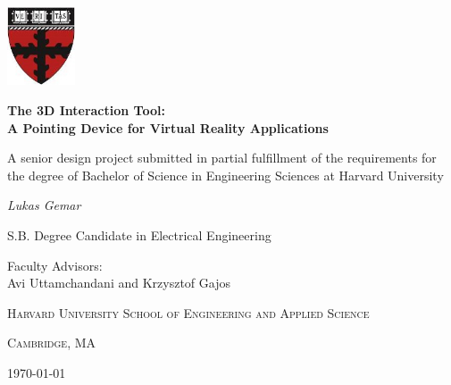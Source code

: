 \documentclass[12pt,a4paper]{report}
\begin{document}
\begin{titlepage}
	\centering
	\includegraphics[width=0.15\textwidth]{seas}\par\vspace{1cm}
	\vspace{1cm}
	{\large\bfseries The 3D Interaction Tool: \\ A Pointing Device for Virtual Reality Applications \par}
	\vspace{1cm}
	{\large A senior design project submitted in partial fulfillment of the requirements for the degree of Bachelor of Science in Engineering Sciences at Harvard University \par}
	\vspace{1cm}

    \vfill
	{\large\itshape Lukas Gemar \par}
    \vspace{0.3cm}
	\large S.B. Degree Candidate in Electrical Engineering \par
	\vfill
	\large Faculty Advisors: \\ Avi Uttamchandani and Krzysztof Gajos\par
	\vfill

	{\large\scshape Harvard University School of Engineering and Applied Science \par}
	\vspace{0.3cm}
	{\large\scshape Cambridge, MA \par}
    \vspace{0.3cm}
	{\today\par}
\end{titlepage}
\end{document}

